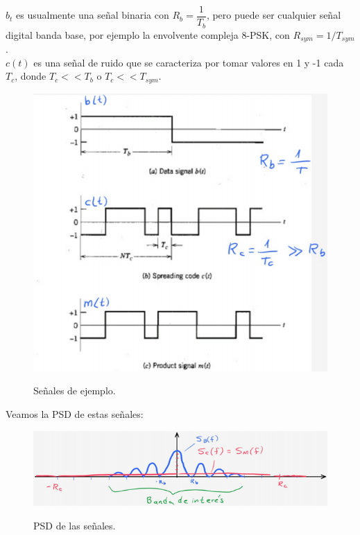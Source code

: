 $b_t$ es usualmente una señal binaria con $R_b= \dfrac{1}{T_b}$, pero puede ser cualquier señal digital banda base, por ejemplo la envolvente compleja 8-PSK, con $R_{sym}= 1/ T_{sym}$.\\

$c(t)$ es una señal de ruido que se caracteriza por tomar valores en 1 y -1 cada $T_c$, donde  $T_{c}<<T_{b}$ o $T_{c}<<T_{sym}$.

\vspace{200px}

\begin{figure}[h!]
	\captionsetup{justification = raggedright, singlelinecheck = false}
	\caption{Señales de ejemplo.} 
	\centering
	\includegraphics[scale=1]{Imagenes/Data.png}
	\label{fig:Data}
\end{figure}

Veamos la PSD de estas señales:

\begin{figure}[h!]
	\captionsetup{justification = raggedright, singlelinecheck = false}
	\caption{PSD de las señales.} 
	\centering
	\includegraphics[scale=1]{Imagenes/Banda-interes.png}
	\label{fig:Banda-interes}
\end{figure}


